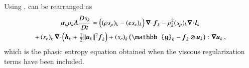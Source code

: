 \documentclass[preprint,10pt]{elsarticle}
\begin{document}
% 
Using ,  can be rearranged as 
\begin{multline}\label{eq:ent-res-7-eqn-diss-terms_rearranged}
\alpha_k \rho_k A \frac{Ds_k}{Dt} 
=  \left( (\rho s_\rho)_k - (e s_e)_k \right) \div \mbold f_k 
- \rho^2_k (s_\rho)_k \div \mbold l_k  \\
+ \left(s_e\right)_k \div \left( \mbold h_k + \tfrac{1}{2} \| \mbold u_k \|^2  \mbold f_k \right)
+ \left(s_e\right)_k \left( \mathbb{g}_k - \mbold f_k \otimes \mbold u_k \right) : \grad \mbold u_k 
\,,
\end{multline}
which is the phasic entropy equation obtained when the viscous regularization terms have been included.
%
\end{document}
